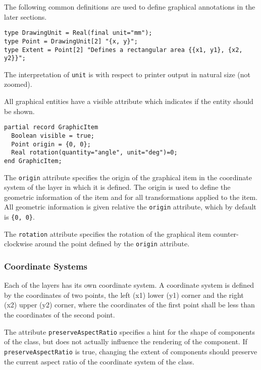 The following common definitions are used to define graphical annotations in the later sections.
\begin{lstlisting}[language=modelica]
type DrawingUnit = Real(final unit="mm");
type Point = DrawingUnit[2] "{x, y}";
type Extent = Point[2] "Defines a rectangular area {{x1, y1}, {x2, y2}}";
\end{lstlisting}%
The interpretation of \lstinline!unit! is with respect to printer output in natural size (not zoomed).

All graphical entities have a visible attribute which indicates if the entity should be shown.
\begin{lstlisting}[language=modelica]
partial record GraphicItem
  Boolean visible = true;
  Point origin = {0, 0};
  Real rotation(quantity="angle", unit="deg")=0;
end GraphicItem;
\end{lstlisting}%
The \lstinline!origin! attribute specifies the origin of the graphical item in the coordinate system of the layer in which it is defined.
The origin is used to define the geometric information of the item and for all transformations applied to the item.
All geometric information is given relative the \lstinline!origin! attribute, which by default is \lstinline!{0, 0}!.

The \lstinline!rotation! attribute specifies the rotation of the graphical item counter-clockwise around the point defined by the \lstinline!origin! attribute.

\subsubsection{Coordinate Systems}\label{coordinate-systems}

Each of the layers has its own coordinate system.
A coordinate system is defined by the coordinates of two points, the left (x1) lower (y1) corner and the right (x2) upper (y2) corner, where the coordinates of the first point shall be less than the coordinates of the second point.

The attribute \lstinline!preserveAspectRatio! specifies a hint for the shape of components of the class, but does not actually influence the rendering of the component.
If \lstinline!preserveAspectRatio! is true, changing the extent of components should preserve the current aspect ratio of the coordinate system of the class.

